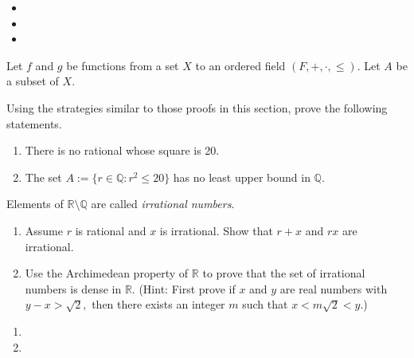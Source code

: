 \documentclass[12pt,letterpaper,boxed]{hmcpset}
\begin{document}
\begin{solution}
\begin{itemize}
	\itemsep0em
	\item 
	\item
	\item
\end{itemize}
\end{solution}

\begin{problem}[Exercise 2.5.]
Let $f$ and $g$ be functions from a set $X$ to an ordered field $(F,+,\cdot,\leq).$ Let $A$ be a subset of $X.$
\end{problem}

\begin{solution}
\end{solution}

\begin{problem}[Exercise 3.3.]
Using the strategies similar to those proofs in this section, prove the following statements.
\vspace{-2mm}
\begin{enumerate}
	\itemsep0em
	\item There is no rational whose square is 20.
	\item The set $A := \{r \in \mathbb{Q} : r^2 \le 20\}$ has no least upper bound in $\mathbb{Q}$. 
\end{enumerate}
\end{problem}

\begin{solution}
\end{solution}

\begin{problem}[Exercise 4.6.]
Elements of $\mathbb{R}\setminus\mathbb{Q}$ are called \textit{irrational numbers}.
\begin{enumerate}
	\itemsep0em
	\item Assume $r$ is rational and $x$ is irrational. Show that $r + x$ and $rx$ are irrational.
	\item Use the Archimedean property of $\mathbb{R}$ to prove that the set of irrational numbers is dense in $\mathbb{R}.$ (Hint: First prove if $x$ and $y$ are real numbers with $y - x > \sqrt{2},$ then there exists an integer $m$ such that $x < m\sqrt{2} < y$.)
\end{enumerate}
\end{problem}

\begin{solution}
\begin{enumerate}
	\itemsep0em
	\item 
	\item 
\end{enumerate}
\end{solution}
\end{document}
